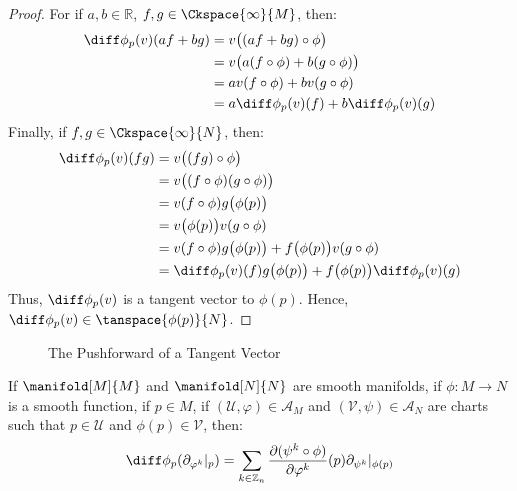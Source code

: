         \begin{proof}
            For if $a,b\in\mathbb{R}$, $f,g\in\Ckspace{\infty}{M}$, then:
            \begin{subequations}
                \begin{align}
                    \diff\phi_{p}(v)(af+bg)
                        &=v\big((af+bg)\circ\phi\big)\\
                        &=v\big(a(f\circ\phi)+b(g\circ\phi)\big)\\
                        &=av(f\circ\phi)+bv(g\circ\phi)\\
                        &=a\diff\phi_{p}(v)(f)+b\diff\phi_{p}(v)(g)
                \end{align}
            \end{subequations}
            Finally, if $f,g\in\Ckspace{\infty}{N}$, then:
            \begin{subequations}
                \begin{align}
                    \diff\phi_{p}(v)(fg)
                        &=v\big((fg)\circ\phi\big)\\
                        &=v\big((f\circ\phi)(g\circ\phi)\big)\\
                        &=v(f\circ\phi)g\big(\phi(p)\big)\\
                        &=v\big(\phi(p)\big)v(g\circ\phi)\\
                        &=v(f\circ\phi)g\big(\phi(p)\big)
                         +f\big(\phi(p)\big)v(g\circ\phi)\\
                        &=\diff\phi_{p}(v)(f)g\big(\phi(p)\big)
                         +f\big(\phi(p)\big)\diff\phi_{p}(v)(g)
                \end{align}
            \end{subequations}
            Thus, $\diff\phi_{p}(v)$ is a tangent vector to $\phi(p)$.
            Hence, $\diff\phi_{p}(v)\in\tanspace{\phi(p)}{N}$.
        \end{proof}
        \begin{figure}[H]
            \centering
            \captionsetup{type=figure}
            
            \caption{The Pushforward of a Tangent Vector}
            \label{fig:Pushforward_of_Tangent_Vector}
        \end{figure}
        \begin{theorem}
            If $\manifold[M]{M}$ and $\manifold[N]{N}$ are smooth manifolds,
            if $\phi:M\rightarrow{N}$ is a smooth function, if $p\in{M}$, if
            $(\mathcal{U},\varphi)\in\mathcal{A}_{M}$ and
            $(\mathcal{V},\psi)\in\mathcal{A}_{N}$ are charts such that
            $p\in\mathcal{U}$ and $\phi(p)\in\mathcal{V}$, then:
            \begin{equation}
                \diff\phi_{p}(\partial_{\varphi^{k}}|_{p})=
                \sum_{k\in\mathbb{Z}_{n}}
                \frac{\partial(\psi^{k}\circ\phi)}{\partial\varphi^{k}}(p)
                \partial_{\psi^{k}}|_{\phi(p)}
            \end{equation}
        \end{theorem}
